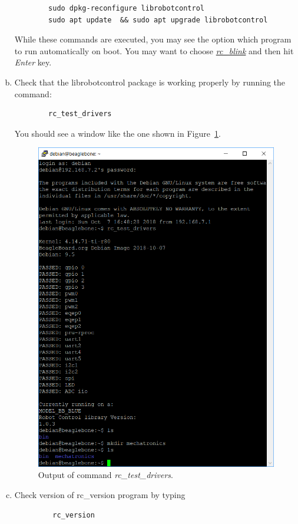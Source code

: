 \begin{enumerate}[a)]
    \begin{verbatim}
        sudo dpkg-reconfigure librobotcontrol
        sudo apt update  && sudo apt upgrade librobotcontrol
    \end{verbatim}
    While these commands are executed, you may see the option which program to run automatically on boot. You may want to choose \underline{\emph{rc\_blink}} and then hit \emph{Enter} key. 
    \item Check that the librobotcontrol package is working properly by running the command: %
%    
    \begin{verbatim}
        rc_test_drivers
    \end{verbatim}
    You should see a window like the one shown in Figure~\ref{fig:rcTestDriver}.
    \begin{figure}
        \centering
        \includegraphics{figs/img/Lab0/rcTestDriver}
        \caption{Output of command \emph{rc\_test\_drivers}.}
        \label{fig:rcTestDriver}
    \end{figure}
    \item Check version of rc\_version program by typing
    \begin{verbatim}
         rc_version
    \end{verbatim}
    
    \end{enumerate}
    
